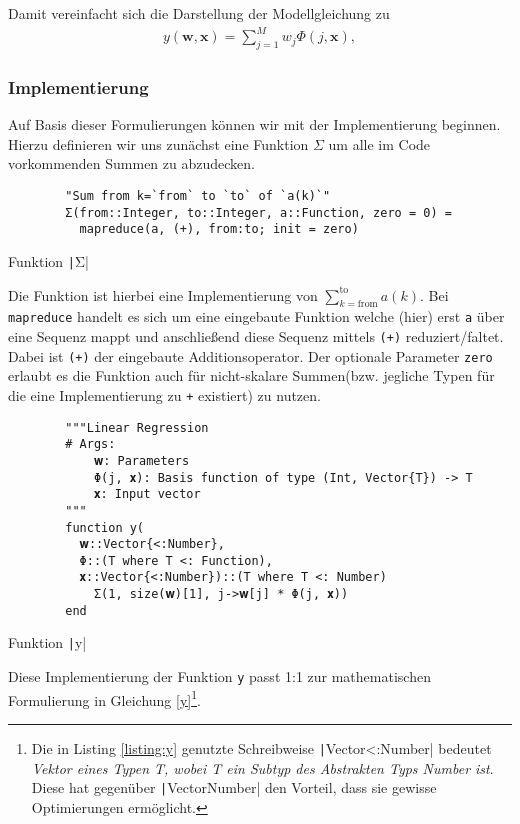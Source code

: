 \documentclass{article}
\theoremstyle{plain} %
\theoremstyle{definition} %
\begin{document}
Damit vereinfacht sich die Darstellung der Modellgleichung zu
\begin{align}
  y(\mathbf{w}, \mathbf{x}) = \sum_{j=1}^{M}w_j\Phi(j, \mathbf{x}), \label{y}
\end{align}

\subsubsection{Implementierung}
Auf Basis dieser Formulierungen können wir mit der Implementierung beginnen.
Hierzu definieren wir uns zunächst eine Funktion \texttt{$\Sigma$} um alle im Code vorkommenden Summen zu abzudecken.

\begin{listing}[!ht]
    \begin{verbatim}
        "Sum from k=`from` to `to` of `a(k)`"
        Σ(from::Integer, to::Integer, a::Function, zero = 0) =
          mapreduce(a, (+), from:to; init = zero)
    \end{verbatim}
    \caption{Funktion \texttt|Σ|}
\end{listing}

Die Funktion ist hierbei eine Implementierung von $\sum_{k=\text{from}}^\text{to}a(k)$. Bei \texttt{mapreduce} handelt es sich um eine eingebaute Funktion welche (hier) erst \texttt{a} über eine Sequenz mappt und anschließend diese Sequenz mittels \texttt{(+)} reduziert/faltet. Dabei ist \texttt{(+)} der eingebaute Additionsoperator. Der optionale Parameter \texttt{zero} erlaubt es die Funktion auch für nicht-skalare Summen(bzw. jegliche Typen für die eine Implementierung zu \texttt{+} existiert) zu nutzen.

\begin{listing}[!ht]
    \begin{verbatim}
        """Linear Regression
        # Args:
            𝐰: Parameters
            Φ(j, 𝐱): Basis function of type (Int, Vector{T}) -> T
            𝐱: Input vector
        """
        function y(
          𝐰::Vector{<:Number},
          Φ::(T where T <: Function),
          𝐱::Vector{<:Number})::(T where T <: Number)
            Σ(1, size(𝐰)[1], j->𝐰[j] * Φ(j, 𝐱))
        end
    \end{verbatim}
    \caption{Funktion \texttt|y|}
    \label{listing:y}
\end{listing}

Diese Implementierung der Funktion \texttt{y} passt 1:1 zur mathematischen Formulierung in Gleichung \ref{y}\footnote{Die in Listing \ref{listing:y} genutzte Schreibweise \texttt|Vector{<:Number}| bedeutet \emph{Vektor eines Typen T, wobei T ein Subtyp des Abstrakten Typs Number ist}. Diese hat gegenüber \texttt|Vector{Number}| den Vorteil, dass sie gewisse Optimierungen ermöglicht.}.
\end{document}

